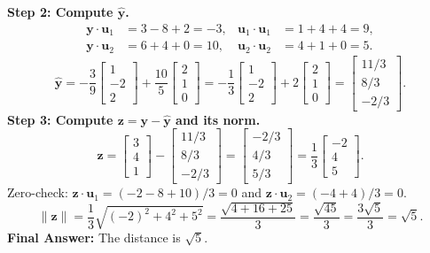 \documentclass[11pt, letterpaper]{article}
\theoremstyle{definition}
\theoremstyle{remark}
\begin{document}
\textbf{Step 2: Compute $\hat{\mathbf{y}}$.}
\begin{align*}
\mathbf{y} \cdot \mathbf{u}_1 &= 3 - 8 + 2 = -3, & \mathbf{u}_1 \cdot \mathbf{u}_1 &= 1 + 4 + 4 = 9, \\
\mathbf{y} \cdot \mathbf{u}_2 &= 6 + 4 + 0 = 10, & \mathbf{u}_2 \cdot \mathbf{u}_2 &= 4 + 1 + 0 = 5.
\end{align*}
\[
\hat{\mathbf{y}} = -\frac{3}{9}\begin{bmatrix} 1 \\ -2 \\ 2 \end{bmatrix} + \frac{10}{5}\begin{bmatrix} 2 \\ 1 \\ 0 \end{bmatrix} = -\frac{1}{3}\begin{bmatrix} 1 \\ -2 \\ 2 \end{bmatrix} + 2\begin{bmatrix} 2 \\ 1 \\ 0 \end{bmatrix} = \begin{bmatrix} 11/3 \\ 8/3 \\ -2/3 \end{bmatrix}.
\]
\textbf{Step 3: Compute $\mathbf{z} = \mathbf{y} - \hat{\mathbf{y}}$ and its norm.}
\[
\mathbf{z} = \begin{bmatrix} 3 \\ 4 \\ 1 \end{bmatrix} - \begin{bmatrix} 11/3 \\ 8/3 \\ -2/3 \end{bmatrix} = \begin{bmatrix} -2/3 \\ 4/3 \\ 5/3 \end{bmatrix} = \frac{1}{3}\begin{bmatrix} -2 \\ 4 \\ 5 \end{bmatrix}.
\]
Zero-check: $\mathbf{z}\cdot\mathbf{u}_1 = (-2 - 8 + 10)/3 = 0$ and $\mathbf{z}\cdot\mathbf{u}_2 = (-4 + 4)/3 = 0$.
\[
\|\mathbf{z}\| = \frac{1}{3}\sqrt{(-2)^2 + 4^2 + 5^2} = \frac{\sqrt{4 + 16 + 25}}{3} = \frac{\sqrt{45}}{3} = \frac{3\sqrt{5}}{3} = \sqrt{5}.
\]
\textbf{Final Answer:} The distance is $\sqrt{5}$.
\end{document}
